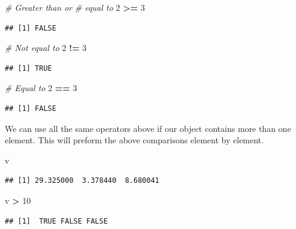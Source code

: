 \documentclass[
]{book}
\newenvironment{Shaded}{\begin{snugshade}}{\end{snugshade}}
\newcommand{\CommentTok}[1]{\textcolor[rgb]{0.56,0.35,0.01}{\textit{#1}}}
\newcommand{\DecValTok}[1]{\textcolor[rgb]{0.00,0.00,0.81}{#1}}
\newcommand{\NormalTok}[1]{#1}
\newcommand{\OperatorTok}[1]{\textcolor[rgb]{0.81,0.36,0.00}{\textbf{#1}}}
\newcommand{\StringTok}[1]{\textcolor[rgb]{0.31,0.60,0.02}{#1}}
\begin{document}
\begin{Shaded}
\begin{Highlighting}[]
\CommentTok{# Greater than or}
\CommentTok{# equal to}
\DecValTok{2} \OperatorTok{>=}\StringTok{ }\DecValTok{3}
\end{Highlighting}
\end{Shaded}

\begin{verbatim}
## [1] FALSE
\end{verbatim}

\begin{Shaded}
\begin{Highlighting}[]
\CommentTok{# Not equal to}
\DecValTok{2} \OperatorTok{!=}\StringTok{ }\DecValTok{3}
\end{Highlighting}
\end{Shaded}

\begin{verbatim}
## [1] TRUE
\end{verbatim}

\begin{Shaded}
\begin{Highlighting}[]
\CommentTok{# Equal to}
\DecValTok{2} \OperatorTok{==}\StringTok{ }\DecValTok{3}
\end{Highlighting}
\end{Shaded}

\begin{verbatim}
## [1] FALSE
\end{verbatim}

We can use all the same operators above if our object contains more than one element. This will preform the above comparisons element by element.

\begin{Shaded}
\begin{Highlighting}[]
\NormalTok{v}
\end{Highlighting}
\end{Shaded}

\begin{verbatim}
## [1] 29.325000  3.378440  8.680041
\end{verbatim}

\begin{Shaded}
\begin{Highlighting}[]
\NormalTok{v }\OperatorTok{>}\StringTok{ }\DecValTok{10}
\end{Highlighting}
\end{Shaded}

\begin{verbatim}
## [1]  TRUE FALSE FALSE
\end{verbatim}
\end{document}
